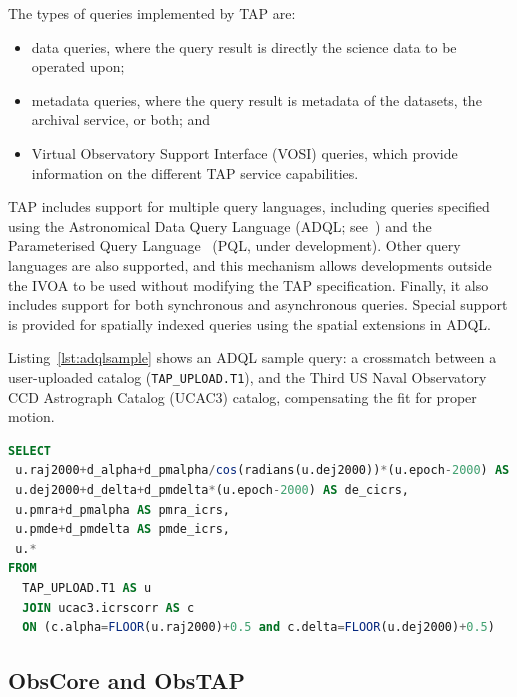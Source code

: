 The types of queries implemented by TAP are:

\begin{itemize}
\item data queries, where the query result is directly the science data to be operated upon;
\item metadata queries, where the query result is metadata of the datasets, the archival service, or both; and
\item Virtual Observatory Support Interface (VOSI) queries, which provide information on the different TAP service capabilities.
\end{itemize}

TAP includes support for multiple query languages, including queries specified using the Astronomical Data Query Language (ADQL; see~\cite{2008adql.ivoav0910O}) and the Parameterised Query Language~\cite{IVOA-Data-Access-Layer-Working-Group:2009lr} (PQL, under development). Other query languages are also supported, and this mechanism allows developments outside the IVOA to be used without modifying the TAP specification. Finally, it also includes support for both synchronous and asynchronous queries. Special support is provided for spatially indexed queries using the spatial extensions in ADQL. 

Listing~\ref{lst:adqlsample} shows an ADQL sample query: a crossmatch between a user-uploaded catalog (\texttt{TAP\_UPLOAD.T1}), and
the Third US Naval Observatory CCD Astrograph Catalog (UCAC3) %
catalog, compensating the fit for proper motion.

\begin{lstlisting}[float,language=SQL,caption={ADQL sample query: the results will be a crossmatch between a user-uploaded catalog, and the UCAC3 catalog, compensating the fit for proper motion.},label=lst:adqlsample]
SELECT 
 u.raj2000+d_alpha+d_pmalpha/cos(radians(u.dej2000))*(u.epoch-2000) AS ra_icrs,
 u.dej2000+d_delta+d_pmdelta*(u.epoch-2000) AS de_cicrs,
 u.pmra+d_pmalpha AS pmra_icrs,
 u.pmde+d_pmdelta AS pmde_icrs,
 u.*
FROM
  TAP_UPLOAD.T1 AS u
  JOIN ucac3.icrscorr AS c
  ON (c.alpha=FLOOR(u.raj2000)+0.5 and c.delta=FLOOR(u.dej2000)+0.5)
\end{lstlisting}

\subsection{ObsCore and ObsTAP} %
\label{sub:obstap}

